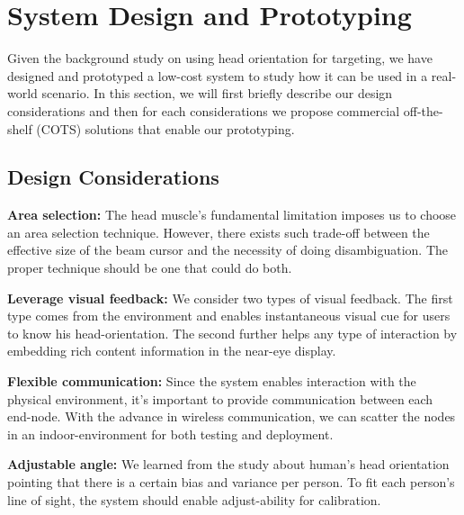 \section{System Design and Prototyping}
\label{sec:syst-design-prot}


Given the background study on using head orientation for targeting, we have designed and prototyped a low-cost system to study how it can be used in a real-world scenario. In this section, we will first briefly describe our design considerations and then for each considerations we propose commercial off-the-shelf (COTS) solutions that enable our prototyping.

\subsection{Design Considerations}
\label{sec:design-cons}


{\bf Area selection:} The head muscle's fundamental limitation imposes us to choose an area selection technique. However, there exists such trade-off between the effective size of the beam cursor and the necessity of doing disambiguation. The proper technique should be one that could do both.

{\bf Leverage visual feedback:} We consider two types of visual feedback. The first type comes from the environment and enables instantaneous visual cue for users to know his head-orientation. The second further helps any type of interaction by embedding rich content information in the near-eye display.

{\bf Flexible communication:} Since the system enables interaction with the physical environment, it's important to provide communication between each end-node. With the advance in wireless communication, we can scatter the nodes in an indoor-environment for both testing and deployment.

{\bf Adjustable angle:} We learned from the study about human's head orientation pointing that there is a certain bias and variance per person. To fit each person's line of sight, the system should enable adjust-ability for calibration.


